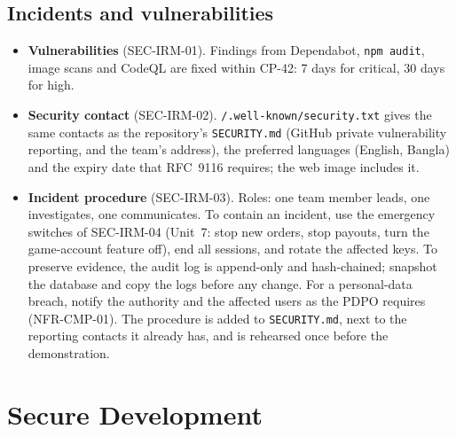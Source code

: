 \documentclass[11pt,a4paper]{article}
\begin{document}
\subsection{Incidents and vulnerabilities}
\begin{itemize}[nosep]
  \item \textbf{Vulnerabilities} (SEC-IRM-01). Findings from Dependabot, \texttt{npm audit}, image scans and CodeQL are fixed within CP-42: 7 days for critical, 30 days for high.
  \item \textbf{Security contact} (SEC-IRM-02). \texttt{/.\allowbreak well-known/security.\allowbreak txt} gives the same contacts as the repository's \texttt{SECURITY.md} (GitHub private vulnerability reporting, and the team's address), the preferred languages (English, Bangla) and the expiry date that RFC~9116 requires; the web image includes it.
  \item \textbf{Incident procedure} (SEC-IRM-03). Roles: one team member leads, one investigates, one communicates. To contain an incident, use the emergency switches of SEC-IRM-04 (Unit~7: stop new orders, stop payouts, turn the game-account feature off), end all sessions, and rotate the affected keys. To preserve evidence, the audit log is append-only and hash-chained; snapshot the database and copy the logs before any change. For a personal-data breach, notify the authority and the affected users as the PDPO requires (NFR-CMP-01). The procedure is added to \texttt{SECURITY.md}, next to the reporting contacts it already has, and is rehearsed once before the demonstration.
\end{itemize}
\section{Secure Development}
\label{sec:sdl}
\end{document}
